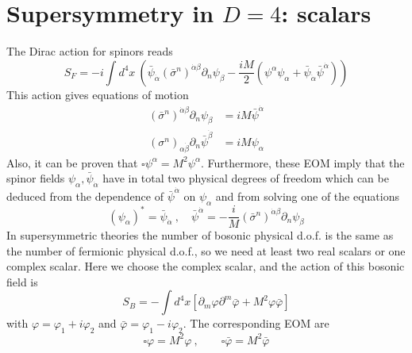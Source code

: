\documentclass[a4paper,12pt]{article}
\numberwithin{equation}{section}
\numberwithin{exe}{section}
\newcommand{\p}{{\partial}}
\renewcommand{\a}{{\alpha}}
\newcommand{\ad}{{\dot\alpha}}
\renewcommand{\b}{{\beta}}
\newcommand{\bd}{{\dot\beta}}
\newcommand{\s}{{\sigma}}
\renewcommand{\sb}{{\bar\sigma}}
\newcommand{\vphi}{{\varphi}}
\newcommand{\vphib}{{\bar\varphi}}
\newcommand{\psib}{{\bar\psi}}
\begin{document}
\section{Supersymmetry in $D=4$: scalars}
The Dirac action for spinors reads
	\begin{equation}\label{fer}
	S_F = -i \int d^4 x\ \left( \psib_\ad (\sb^n)^{\ad\b} \p_n \psi_\b - \frac{iM}{2}(\psi^\a \psi_\a + \psib_\ad \psib^\ad )\right)
	\end{equation}
This action gives equations of motion
	\begin{align}
	(\sb^n)^{\ad\b} \p_n \psi_\b & = iM\psib^\ad \\
	(\s^n)_{\a\bd} \p_n \psib^\bd & = iM\psi_\a
	\end{align}
Also, it can be proven that $\square\psi^\a = M^2 \psi^\a$. Furthermore, these EOM imply that the spinor fields $\psi_\a, \psib_\ad$ have in total two physical degrees of freedom which can be deduced from the dependence of $\psib^\ad$ on $\psi_\a$ and from solving one of the equations
	\begin{equation}
	(\psi_\a)^* = \psib_\ad\ ,\quad\psib^\ad = -\frac{i}{M} (\sb^n)^{\ad\b} \p_n\psi_\b
	\end{equation}
In supersymmetric theories the number of bosonic physical d.o.f. is the same as the number of fermionic physical d.o.f., so we need at least two real scalars or one complex scalar. Here we choose the complex scalar, and the action of this bosonic field is
	\begin{equation}\label{bos}
	S_B = -\int d^4 x [\p_m\vphi\p^m\vphib + M^2\vphi\vphib]
	\end{equation}
with $\vphi = \vphi_1 + i \vphi_2$ and $\vphib = \vphi_1 -i\vphi_2$. The corresponding EOM are
	\begin{equation}
	\square\vphi = M^2 \vphi\ ,\qquad \square\vphib = M^2 \vphib
	\end{equation}
\end{document}
